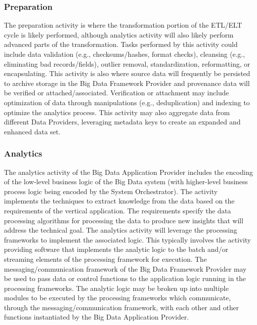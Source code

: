 \documentclass[11pt]{article}
\begin{document}
\subsubsection{Preparation}

The preparation activity is where the transformation portion of the ETL/ELT cycle is likely performed, 
although analytics activity will also likely perform advanced parts of the transformation. Tasks performed 
by this activity could include data validation (e.g., checksums/hashes, format checks), cleansing (e.g., 
eliminating bad records/fields), outlier removal, standardization, reformatting, or encapsulating. This 
activity is also where source data will frequently be persisted to archive storage in the Big Data 
Framework Provider and provenance data will be verified or attached/associated. Verification or 
attachment may include optimization of data through manipulations (e.g., deduplication) and indexing to 
optimize the analytics process. This activity may also aggregate data from different Data Providers, 
leveraging metadata keys to create an expanded and enhanced data set.

\subsubsection{Analytics}

The analytics activity of the Big Data Application Provider includes the encoding of the low-level 
business logic of the Big Data system (with higher-level business process logic being encoded by the 
System Orchestrator). The activity implements the techniques to extract knowledge from the data based 
on the requirements of the vertical application. The requirements specify the data processing algorithms 
for processing the data to produce new insights that will address the technical goal. The analytics activity 
will leverage the processing frameworks to implement the associated logic. This typically involves the 
activity providing software that implements the analytic logic to the batch and/or streaming elements of 
the processing framework for execution. The messaging/communication framework of the Big Data 
Framework Provider may be used to pass data or control functions to the application logic running in the 
processing frameworks. The analytic logic may be broken up into multiple modules to be executed by the 
processing frameworks which communicate, through the messaging/communication framework, with 
each other and other functions instantiated by the Big Data Application Provider.
\end{document}
